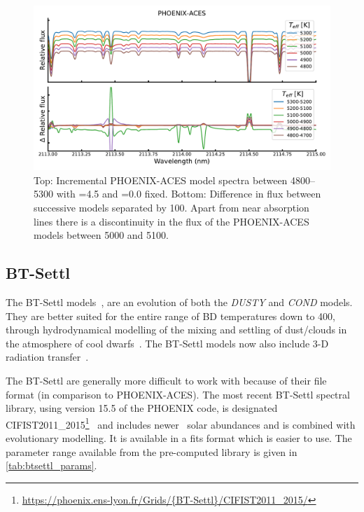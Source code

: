 \begin{figure}
    \centering
    \includegraphics[width=0.8\linewidth]{figures/atmos_and_models/phoenix_differece_at_5000K}
    \caption[Difference in successive {PHOENIX-ACES} spectra around 5000\K.]{Top: Incremental {PHOENIX-ACES} model spectra between 4800--5300\K{} with \Logg{}=4.5 and \feh{}=0.0 fixed.
    Bottom: Difference in flux between successive models separated by 100\K{}.
    Apart from near absorption lines there is a discontinuity in the flux of the {PHOENIX-ACES} models between 5000 and 5100\K{}.}
    \label{fig:phoenixdiffereceat5000k}
\end{figure}

\subsection{BT-Settl}
\label{subsec:btsettl}
The {BT-Settl} models~\citep{allard_models_2012,allard_atmospheres_2012,rajpurohit_effective_2013,baraffe_new_2015}, are an evolution of both the \emph{DUSTY} and \emph{COND} models.
They are better suited for the entire range of {BD} temperatures down to 400\K{}, through hydrodynamical modelling of the mixing and settling of dust/clouds in the atmosphere of cool dwarfs~\citep{freytag_role_2010}.
The {BT-Settl} models now also include 3-D radiation transfer~\citep{seelmann_3d_2010}.

The {BT-Settl} are generally more difficult to work with because of their file format (in comparison to {PHOENIX-ACES}).
The most recent {BT-Settl} spectral library, using version 15.5 of the {PHOENIX} code, is designated {CIFIST2011\_2015}\footnote{\url{https://phoenix.ens-lyon.fr/Grids/{BT-Settl}/CIFIST2011_2015/}}~\citep{baraffe_new_2015} and includes newer~\citet{caffau_solar_2011} solar abundances and is combined with evolutionary modelling.
It is available in a fits format which is easier to use.
The parameter range available from the pre-computed library is given in \cref{tab:btsettl_params}.

